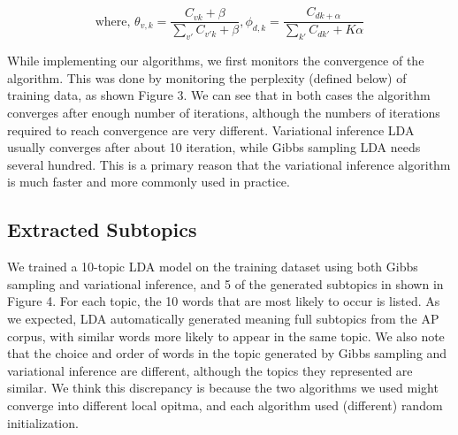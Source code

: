 \documentclass{article} %
\begin{document}
$$\text{where, }\theta_{v,k} = \frac{C_{vk}+\beta}{\sum_{v'}C_{v' k}+\beta}, \phi_{d,k} = \frac{C_{dk+\alpha}}{\sum_{k'}C_{dk'}+K\alpha}$$


While implementing our algorithms, we first monitors the convergence of the algorithm. This was done by monitoring the perplexity (defined below) of training data, as shown Figure 3. We can see that in both cases the algorithm converges after enough number of iterations, although the numbers of iterations required to reach convergence are very different. Variational inference LDA usually converges after about 10 iteration, while Gibbs sampling LDA needs several hundred. This is a primary reason that the variational inference algorithm is much faster and more commonly used in practice.

\subsection{Extracted Subtopics}
We trained a 10-topic LDA model on the training dataset using both Gibbs sampling and variational inference, and 5 of the generated subtopics in shown in Figure 4. For each topic, the 10 words that are most likely to occur is listed. As we expected, LDA automatically generated meaning full subtopics from the AP corpus, with similar words more likely to appear in the same topic. We also note that the choice and order of words in the topic generated by Gibbs sampling and variational inference are different, although the topics they represented are similar. We think this discrepancy is because the two algorithms we used might converge into different local opitma, and each algorithm used (different) random initialization.
\end{document}
